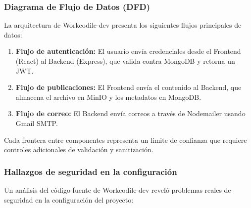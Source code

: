 \subsubsection{Diagrama de Flujo de Datos (DFD)}

La arquitectura de Workcodile-dev presenta los siguientes flujos principales de datos:

\begin{enumerate}
    \item \textbf{Flujo de autenticación:} El usuario envía credenciales desde el Frontend (React) al Backend (Express), que valida contra MongoDB y retorna un JWT.
    \item \textbf{Flujo de publicaciones:} El Frontend envía el contenido al Backend, que almacena el archivo en MinIO y los metadatos en MongoDB.
    \item \textbf{Flujo de correo:} El Backend envía correos a través de Nodemailer usando Gmail SMTP.
\end{enumerate}

Cada frontera entre componentes representa un límite de confianza que requiere controles adicionales de validación y sanitización.

\subsubsection{Hallazgos de seguridad en la configuración}

Un análisis del código fuente de Workcodile-dev reveló problemas reales de seguridad en la configuración del proyecto:

\begin{table}[h]
\centering
\small
{}
\caption{Hallazgos de seguridad en Workcodile-dev}
\label{tab:hallazgos}
\end{table}

